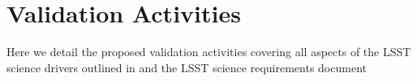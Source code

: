 \section{Validation Activities} \label{sec:activities}

Here we detail the proposed validation activities covering all aspects of the  LSST science drivers outlined in  and the  LSST science requirements document 

